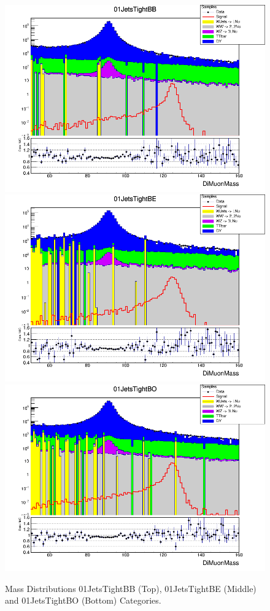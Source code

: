\begin{figure}[H]
  \centering
  \includegraphics[width=0.65\linewidth]{figures/ch_higgs/distributions/baseline_kalman/distribution__01JetsTightBB__DiMuonMass__logY.png}\\
  \includegraphics[width=0.65\linewidth]{figures/ch_higgs/distributions/baseline_kalman/distribution__01JetsTightBE__DiMuonMass__logY.png}\\
  \includegraphics[width=0.65\linewidth]{figures/ch_higgs/distributions/baseline_kalman/distribution__01JetsTightBO__DiMuonMass__logY.png}
  \caption{Mass Distributions 01JetsTightBB (Top), 01JetsTightBE (Middle) and 01JetsTightBO (Bottom) Categories.}
  \label{fig:higgs_categorization_01jetstightbbbebo}
\end{figure}
